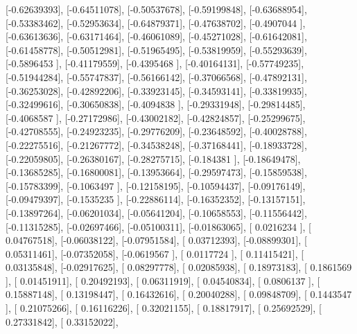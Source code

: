 \documentclass{article}
\begin{document}
       [-0.62639393],
       [-0.64511078],
       [-0.50537678],
       [-0.59199848],
       [-0.63688954],
       [-0.53383462],
       [-0.52953634],
       [-0.64879371],
       [-0.47638702],
       [-0.4907044 ],
       [-0.63613636],
       [-0.63171464],
       [-0.46061089],
       [-0.45271028],
       [-0.61642081],
       [-0.61458778],
       [-0.50512981],
       [-0.51965495],
       [-0.53819959],
       [-0.55293639],
       [-0.5896453 ],
       [-0.41179559],
       [-0.4395468 ],
       [-0.40164131],
       [-0.57749235],
       [-0.51944284],
       [-0.55747837],
       [-0.56166142],
       [-0.37066568],
       [-0.47892131],
       [-0.36253028],
       [-0.42892206],
       [-0.33923145],
       [-0.34593141],
       [-0.33819935],
       [-0.32499616],
       [-0.30650838],
       [-0.4094838 ],
       [-0.29331948],
       [-0.29814485],
       [-0.4068587 ],
       [-0.27172986],
       [-0.43002182],
       [-0.42824857],
       [-0.25299675],
       [-0.42708555],
       [-0.24923235],
       [-0.29776209],
       [-0.23648592],
       [-0.40028788],
       [-0.22275516],
       [-0.21267772],
       [-0.34538248],
       [-0.37168441],
       [-0.18933728],
       [-0.22059805],
       [-0.26380167],
       [-0.28275715],
       [-0.184381  ],
       [-0.18649478],
       [-0.13685285],
       [-0.16800081],
       [-0.13953664],
       [-0.29597473],
       [-0.15859538],
       [-0.15783399],
       [-0.1063497 ],
       [-0.12158195],
       [-0.10594437],
       [-0.09176149],
       [-0.09479397],
       [-0.1535235 ],
       [-0.22886114],
       [-0.16352352],
       [-0.13157151],
       [-0.13897264],
       [-0.06201034],
       [-0.05641204],
       [-0.10658553],
       [-0.11556442],
       [-0.11315285],
       [-0.02697466],
       [-0.05100311],
       [-0.01863065],
       [ 0.0216234 ],
       [ 0.04767518],
       [-0.06038122],
       [-0.07951584],
       [ 0.03712393],
       [-0.08899301],
       [ 0.05311461],
       [-0.07352058],
       [-0.0619567 ],
       [ 0.0117724 ],
       [ 0.11415421],
       [ 0.03135848],
       [-0.02917625],
       [ 0.08297778],
       [ 0.02085938],
       [ 0.18973183],
       [ 0.1861569 ],
       [ 0.01451911],
       [ 0.20492193],
       [ 0.06311919],
       [ 0.04540834],
       [ 0.0806137 ],
       [ 0.15887148],
       [ 0.13198447],
       [ 0.16432616],
       [ 0.20040288],
       [ 0.09848709],
       [ 0.1443547 ],
       [ 0.21075266],
       [ 0.16116226],
       [ 0.32021155],
       [ 0.18817917],
       [ 0.25692529],
       [ 0.27331842],
       [ 0.33152022],
\end{document}
